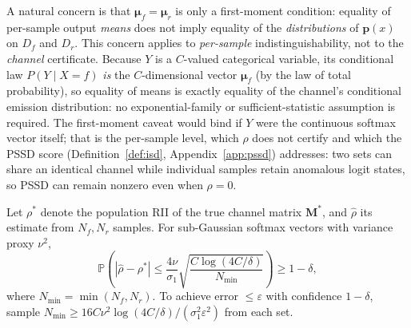 \documentclass[smallextended]{svjour3}       %
\begin{document}
\begin{remark}
\label{rem:channel}
A natural concern is that $\boldsymbol{\mu}_f=\boldsymbol{\mu}_r$ is only a first-moment condition: equality of per-sample output \emph{means} does not imply equality of the \emph{distributions} of $\mathbf{p}(x)$ on $D_f$ and $D_r$. This concern applies to \emph{per-sample} indistinguishability, not to the \emph{channel} certificate. Because $Y$ is a $C$-valued categorical variable, its conditional law $P(Y\mid X{=}f)$ \emph{is} the $C$-dimensional vector $\boldsymbol{\mu}_f$ (by the law of total probability), so equality of means is exactly equality of the channel's conditional emission distribution: no exponential-family or sufficient-statistic assumption is required. The first-moment caveat would bind if $Y$ were the continuous softmax vector itself; that is the per-sample level, which $\rho$ does not certify and which the PSSD score (Definition~\ref{def:isd}, Appendix~\ref{app:pssd}) addresses: two sets can share an identical channel while individual samples retain anomalous logit states, so PSSD can remain nonzero even when $\rho=0$.
\end{remark}

\begin{proposition}
\label{prop:confidence}
Let $\rho^*$ denote the population RII of the true channel matrix $\mathbf{M}^*$, and $\hat{\rho}$ its estimate from $N_f, N_r$ samples. For sub-Gaussian softmax vectors with variance proxy $\nu^2$,
\begin{equation}
\mathbb{P}\!\left(|\hat{\rho} - \rho^*| \le \frac{4\nu}{\sigma_1}\sqrt{\frac{C\log(4C/\delta)}{N_{\min}}}\right) \ge 1-\delta,
\end{equation}
where $N_{\min}=\min(N_f,N_r)$. To achieve error $\le\varepsilon$ with confidence $1-\delta$, sample $N_{\min} \ge 16C\nu^2\log(4C/\delta)/(\sigma_1^2\varepsilon^2)$ from each set.
\end{proposition}
\end{document}

